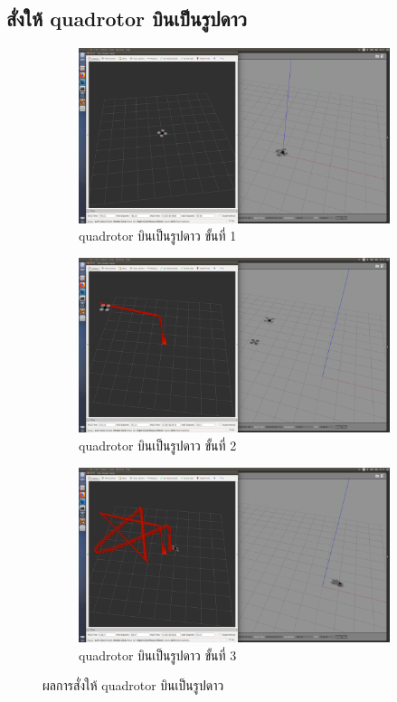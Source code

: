 \subsection{สั่งให้ quadrotor บินเป็นรูปดาว}
\begin{figure}[!ht]
    \centering
    \begin{subfigure}[b]{0.7\textwidth}
        \centering
        \includegraphics[width=\textwidth]{images/test/drone_rg1.png}
        \caption{quadrotor บินเป็นรูปดาว ขั้นที่ 1}
	\end{subfigure}
	\hfill
    \begin{subfigure}[b]{0.7\textwidth}
        \centering
        \includegraphics[width=\textwidth]{images/test/drone_rg2.png}
        \caption{quadrotor บินเป็นรูปดาว ขั้นที่ 2}
    \end{subfigure}
    \hfill
    \begin{subfigure}[b]{0.7\textwidth}
        \centering
        \includegraphics[width=\textwidth]{images/test/drone_rg3.png}
        \caption{quadrotor บินเป็นรูปดาว ขั้นที่ 3}
    \end{subfigure}
    \caption{ผลการสั่งให้ quadrotor บินเป็นรูปดาว}
\end{figure}